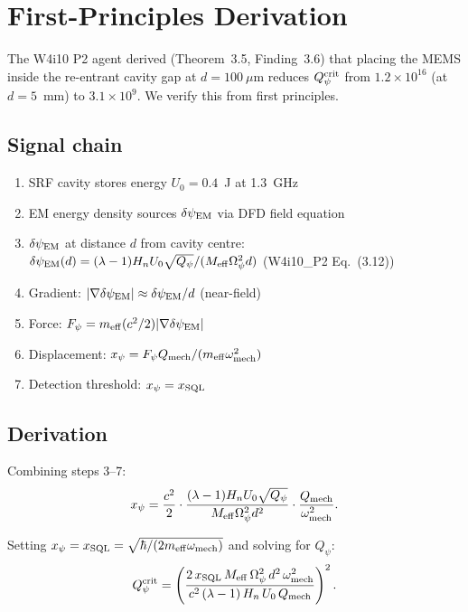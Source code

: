 \documentclass[11pt]{article}
\newcommand{\lam}{\lambda}
\newcommand{\Qpsi}{Q_\psi}
\newcommand{\Meff}{M_{\rm eff}}
\newcommand{\ee}[1]{\times 10^{#1}}
\newcommand{\Qmech}{Q_{\rm mech}}
\newcommand{\Heff}{H_n}
\newcommand{\dpsiEM}{\delta\psi_{\rm EM}}
\theoremstyle{definition}
\theoremstyle{remark}
\begin{document}
\section{First-Principles Derivation}
\label{sec:mems_derivation}

The W4i10 P2 agent derived (Theorem~3.5, Finding~3.6) that placing
the MEMS inside the re-entrant cavity gap at $d = 100~\mu$m reduces
$\Qpsi^{\rm crit}$ from $1.2\ee{16}$ (at $d = 5$~mm) to $3.1\ee{9}$.
We verify this from first principles.

\subsection{Signal chain}

\begin{enumerate}[nosep]
\item SRF cavity stores energy $U_0 = 0.4$~J at 1.3~GHz
\item EM energy density sources $\dpsiEM$ via DFD field equation
\item $\dpsiEM$ at distance $d$ from cavity centre:
  $\dpsiEM(d) = (\lam-1)\Heff U_0\sqrt{\Qpsi}/(\Meff\Omega_\psi^2 d)$
  (W4i10\_P2 Eq.~(3.12))
\item Gradient: $|\nabla\dpsiEM| \approx \dpsiEM/d$ (near-field)
\item Force: $F_\psi = m_{\rm eff}(c^2/2)|\nabla\dpsiEM|$
\item Displacement: $x_\psi = F_\psi Q_{\rm mech}/(m_{\rm eff}\omega_{\rm mech}^2)$
\item Detection threshold: $x_\psi = x_{\rm SQL}$
\end{enumerate}

\subsection{Derivation}

Combining steps 3--7:
\begin{equation}
x_\psi = \frac{c^2}{2}\cdot
\frac{(\lam-1)\Heff U_0\sqrt{\Qpsi}}{\Meff\Omega_\psi^2 d^2}
\cdot\frac{\Qmech}{\omega_{\rm mech}^2}.
\label{eq:x_psi_full}
\end{equation}

Setting $x_\psi = x_{\rm SQL} = \sqrt{\hbar/(2m_{\rm eff}\omega_{\rm mech})}$
and solving for $\Qpsi$:
\begin{equation}
\Qpsi^{\rm crit} = \left(\frac{2\,x_{\rm SQL}\,\Meff\,\Omega_\psi^2\,d^2\,
\omega_{\rm mech}^2}{c^2\,(\lam-1)\,\Heff\,U_0\,\Qmech}\right)^2.
\label{eq:Qpsi_crit}
\end{equation}
\end{document}
